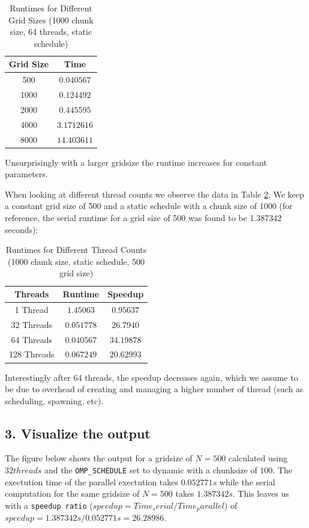 \documentclass[a4paper,10pt]{article}
\begin{document}
\begin{table}[h!]
\centering
\begin{tabular}{|c|c|}
\hline
\textbf{Grid Size} & \textbf{Time} \\
\hline
500  & $0.040567$  \\
1000 & $0.124492$ \\
2000 & $0.445595$ \\
4000 & $3.1712616$ \\
8000 & $14.403611$ \\
\hline
\end{tabular}
\caption{Runtimes for Different Grid Sizes (1000 chunk size, 64 threads, static schedule)}
\label{table:ex5_grid_changes}
\end{table}

Unsurprisingly with a larger gridsize the runtime increases for constant parameters.


When looking at different thread counts we observe the data in Table \ref{table:ex5_thread_changes}. We keep a constant grid size of 500 and a static schedule with a chunk size of 1000 (for reference, the serial runtime for a grid size of 500 was found to be 1.387342 seconds):
\begin{table}[h!]
\centering
\begin{tabular}{|c|c|c|}
\hline
\textbf{Threads} & \textbf{Runtime} & \textbf{Speedup} \\
\hline
1 Thread  & $1.45063$  & $0.95637$ \\
32 Threads & $0.051778$ & $26.7940$ \\
64 Threads & $0.040567$ & $34.19878$ \\
128 Threads & $0.067249$ & $20.62993$ \\
\hline
\end{tabular}
\caption{Runtimes for Different Thread Counts (1000 chunk size, static schedule, 500 grid size)}
\label{table:ex5_thread_changes}
\end{table}

Interestingly after 64 threads, the speedup decreases again, which we assume to be due to overhead of creating and managing a higher number of thread (such as scheduling, spawning, etc).

\subsection{3. Visualize the output}
The figure below shows the output for a gridsize of $N=500$ calculated using $32 threads$ and the \verb|OMP_SCHEDULE| set to dynamic with a 
chunksize of $ 100 $.
The exectution time of the parallel exectution takes $0.052771s$ while the serial computation for the same gridsize of $N=500$ takes $1.387342s$.  
This leaves us with a \verb|speedup ratio| ($speedup = Time_serial / Time_parallel$) of $speedup = 1.387342s/0.052771s = 26.28986 $. 
\end{document}

